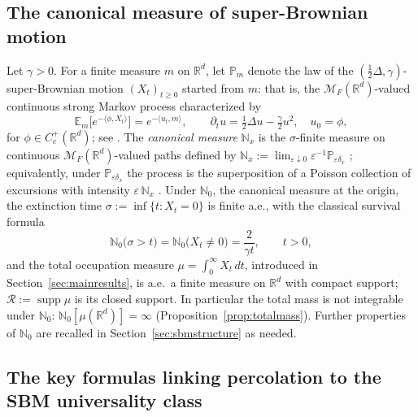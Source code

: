 \documentclass[11pt]{article}
\theoremstyle{definition}
\theoremstyle{remark}
\newcommand{\R}{\mathbb{R}}
\newcommand{\E}{\mathbb{E}}
\newcommand{\bP}{\mathbb{P}}
\newcommand{\bN}{{\mathbb{N}_0}}                 %
\newcommand{\cM}{{\mathcal{M}_F(\R^d)}}          %
\newcommand{\Cc}{C_c^+(\R^d)}
\newcommand{\supp}{\operatorname{supp}}
\newcommand{\Ran}{\mathcal{R}}                 %
\newcommand{\eps}{\varepsilon}
\numberwithin{equation}{section}
\theoremstyle{plain}
\theoremstyle{definition}
\theoremstyle{remark}
\theoremstyle{plain}
\begin{document}
\subsection{The canonical measure of super-Brownian motion}\label{sec:SBM}

Let $\gamma>0$. For a finite measure $m$ on $\R^d$, let $\bP_m$ denote the law of the
$(\tfrac12\Delta,\gamma)$-super-Brownian motion $(X_t)_{t\ge0}$ started from
$m$: that is, the $\cM$-valued continuous strong Markov process characterized by
\begin{equation}\label{eq:laplace}
\E_m\bigl[e^{-\langle\phi,X_t\rangle}\bigr]=e^{-\langle u_t,m\rangle},
\qquad
\partial_t u=\tfrac12\Delta u-\tfrac{\gamma}{2}u^2,\quad u_0=\phi,
\end{equation}
for $\phi\in\Cc$; see \cite{Eth00,LG99,Per02}. The \emph{canonical measure}
$\mathbb{N}_x$ is the $\sigma$-finite measure on continuous $\cM$-valued paths
defined by $\mathbb{N}_x:=\lim_{\eps\downarrow0}\eps^{-1}\bP_{\eps\delta_x}$
\cite[Exercice II.7.2]{Per02};
equivalently, under $\bP_{\eps\delta_x}$ the process is the superposition of a
Poisson collection of excursions with intensity $\eps\,\mathbb{N}_x$
\cite[Theorem~IV.4]{LG99}. Under $\bN$, the canonical measure at the origin, the
extinction time $\sigma:=\inf\{t:X_t=0\}$ is finite a.e., with the classical
survival formula
\begin{equation}\label{eq:survival}
\bN\bigl(\sigma>t\bigr)=\bN\bigl(X_t\neq0\bigr)=\frac{2}{\gamma t},
\qquad t>0,
\end{equation}
and the total occupation measure $\mu=\int_0^\infty X_t\,dt$, introduced in Section~\ref{sec:mainresults}, is a.e.\ a finite
measure on $\R^d$ with compact support; $\Ran:=\supp\mu$ is its closed support.
In particular the total mass is not integrable under $\bN$: $\bN[\mu(\R^d)]=\infty$
(Proposition~\ref{prop:totalmass}). Further properties of $\bN$ are recalled in
Section~\ref{sec:sbmstructure} as needed.

\subsection{The key formulas linking percolation to the SBM universality class}\label{sec:guiding}
\end{document}
